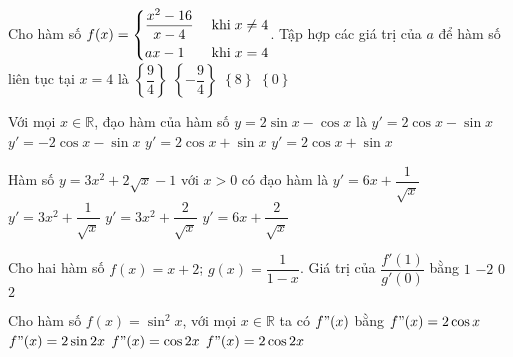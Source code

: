\begin{ex}%
Cho hàm số $f(x)=\left\{\begin{aligned}&\dfrac{x^2-16}{x-4}\; &\text{khi}\; x\ne 4\\&ax-1 \; &\text{khi}\; x= 4\end{aligned}\right.$. Tập hợp các giá trị của $a$ để hàm số liên tục tại $x=4$ là
\choice
{\True $\left\{\dfrac{9}{4}\right\}$}
{$\left\{-\dfrac{9}{4}\right\}$}
{$\left\{8\right\}$}
{$\left\{0\right\}$}
\end{ex}


\begin{ex}%
Với mọi $x\in\mathbb{R}$, đạo hàm của hàm số $y=2\sin x-\cos x$ là
\choice
{$y'=2\cos x-\sin x$}
{$y'=-2\cos x-\sin x$}
{$y'=2\cos x+\sin x$}
{\True $y'=2\cos x+\sin x$}
\end{ex}


\begin{ex}%
Hàm số $y=3x^2+2\sqrt{x}-1$ với $x>0$ có đạo hàm là
\choice
{\True $y'=6x+\dfrac{1}{\sqrt{x}}$}
{$y'=3x^2+\dfrac{1}{\sqrt{x}}$}
{$y'=3x^2+\dfrac{2}{\sqrt{x}}$}
{$y'=6x+\dfrac{2}{\sqrt{x}}$}
\end{ex}


\begin{ex}%
Cho hai hàm số $f(x)=x+2$; $g(x)=\dfrac{1}{1-x}$. Giá trị của $\dfrac{f'(1)}{g'(0)}$ bằng
\choice
{\True $1$}
{$-2$}
{$0$}
{$2$}
\end{ex}


\begin{ex}%
Cho hàm số $f(x)=\sin^2x$, với mọi $x\in \mathbb{R}$ ta có $f"(x)$ bằng
\choice
{$f"(x)=2\cos x$}
{$f"(x)=2\sin 2x$}
{$f"(x)=\cos 2x$}
{\True $f"(x)=2\cos 2x$}
\end{ex}


